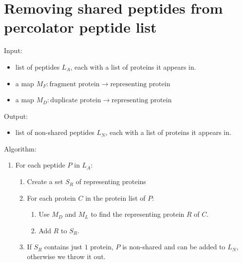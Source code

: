 \documentclass{article}
\begin{document}
\section{Removing shared peptides from percolator peptide list}

Input: 
\begin{itemize}
 \item list of peptides $L_A$, each with a list of proteins it
appears in.
 \item a map $M_F: \mbox{fragment protein} \to \mbox{representing
protein}$
 \item a map $M_D: \mbox{duplicate protein} \to \mbox{representing
protein}$
\end{itemize}

Output:
\begin{itemize}
 \item list of non-shared peptides $L_N$, each with a list of proteins
it appears in.
\end{itemize}

\bigskip
Algorithm:
\begin{enumerate}
 \item For each peptide $P$ in $L_A$:
 \begin{enumerate}
  \item Create a set $S_R$ of representing proteins
  \item For each protein $C$ in the protein list of $P$:
  \begin{enumerate}
   \item Use $M_D$ and $M_L$ to find the representing protein $R$ of
$C$.
   \item Add $R$ to $S_R$.
  \end{enumerate}
  \item If $S_R$ contains just $1$ protein, $P$ is non-shared
and can be added to $L_N$, otherwise we throw it out.
 \end{enumerate}
\end{enumerate}
\end{document}
